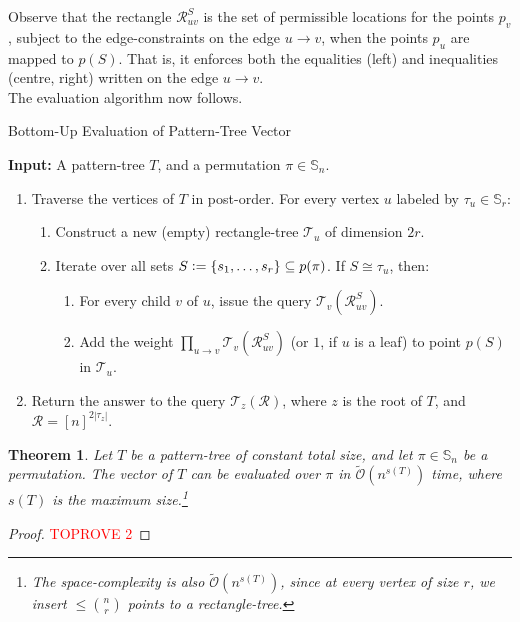 \documentclass{article}
\newtheorem{theorem}{Theorem}[section]
\newcommand{\eqdef}{\vcentcolon=}
\theoremstyle{remark}
\newcommand{\Otilde}[1]{\widetilde{\mathcal{O}}\left( #1 \right)}
\theoremstyle{plain}
\begin{document}
Observe that the rectangle $\mathcal{R}_{uv}^S$ is the set of permissible
locations for the points $p_v$, subject to the edge-constraints on the edge $u \to v$,
when the points $p_u$ are mapped to $p(S)$. That is, it enforces both the equalities (left)
and inequalities (centre, right) written on the edge $u \to v$.\ \\

The evaluation algorithm now follows.

\begin{algorithm}[H]
\caption{Bottom-Up Evaluation of Pattern-Tree Vector}
\label{alg:bottom_up_pattern_tree}
\vspace{0.2cm}\hspace*{\algorithmicindent} \textbf{Input:} A pattern-tree $T$, and a permutation $\pi \in \mathbb{S}_n$. 
\begin{enumerate}
    \item Traverse the vertices of $T$ in post-order. For every vertex $u$ labeled by $\tau_u \in \mathbb{S}_r$:
    \begin{enumerate}
        \item Construct a new (empty) rectangle-tree $\mathcal{T}_u$ of dimension $2r$.
        \item Iterate over all sets $S \eqdef \{ s_1, \dots, s_r\} \subseteq p(\pi)$. If $S \cong \tau_u$, then:
        \begin{enumerate}
            \item For every child $v$ of $u$, issue the query $\mathcal{T}_v(\mathcal{R}_{uv}^S)$.
            \item Add the weight $\prod_{u \to v} \mathcal{T}_v(\mathcal{R}_{uv}^S)$ (or $1$, if $u$ is a leaf) to point $p(S)$ in $\mathcal{T}_u$.
        \end{enumerate}
    \end{enumerate}
    \item Return the answer to the query $\mathcal{T}_{z}(\mathcal{R})$, where $z$ is the root of $T$, and $\mathcal{R} = [n]^{2 |\tau_z|}$.
\end{enumerate}
\end{algorithm}
\begin{theorem}
    \label{thm:computing_pattern_trees}
    Let $T$ be a pattern-tree of constant total size, and let $\pi \in \mathbb{S}_n$ be a permutation.
    The vector of $T$ can be evaluated over $\pi$ in $\Otilde{n^{s(T)}}$ time, where $s(T)$ is the \textit{maximum size}.\footnote{
        The space-complexity is also $\Otilde{n^{s(T)}}$,
        since at every vertex of size $r$, we insert $\le \binom{n}{r}$ points to a rectangle-tree.
    }
\end{theorem}
\begin{proof}\textcolor{red}{TOPROVE 2}\end{proof}
\end{document}

